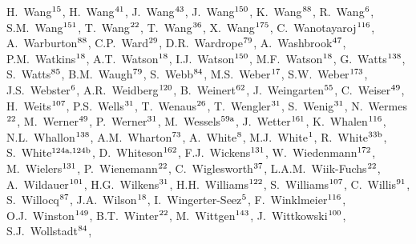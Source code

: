 \begin{flushleft}
H.~Wang$^\textrm{\scriptsize 15}$,
H.~Wang$^\textrm{\scriptsize 41}$,
J.~Wang$^\textrm{\scriptsize 43}$,
J.~Wang$^\textrm{\scriptsize 150}$,
K.~Wang$^\textrm{\scriptsize 88}$,
R.~Wang$^\textrm{\scriptsize 6}$,
S.M.~Wang$^\textrm{\scriptsize 151}$,
T.~Wang$^\textrm{\scriptsize 22}$,
T.~Wang$^\textrm{\scriptsize 36}$,
X.~Wang$^\textrm{\scriptsize 175}$,
C.~Wanotayaroj$^\textrm{\scriptsize 116}$,
A.~Warburton$^\textrm{\scriptsize 88}$,
C.P.~Ward$^\textrm{\scriptsize 29}$,
D.R.~Wardrope$^\textrm{\scriptsize 79}$,
A.~Washbrook$^\textrm{\scriptsize 47}$,
P.M.~Watkins$^\textrm{\scriptsize 18}$,
A.T.~Watson$^\textrm{\scriptsize 18}$,
I.J.~Watson$^\textrm{\scriptsize 150}$,
M.F.~Watson$^\textrm{\scriptsize 18}$,
G.~Watts$^\textrm{\scriptsize 138}$,
S.~Watts$^\textrm{\scriptsize 85}$,
B.M.~Waugh$^\textrm{\scriptsize 79}$,
S.~Webb$^\textrm{\scriptsize 84}$,
M.S.~Weber$^\textrm{\scriptsize 17}$,
S.W.~Weber$^\textrm{\scriptsize 173}$,
J.S.~Webster$^\textrm{\scriptsize 6}$,
A.R.~Weidberg$^\textrm{\scriptsize 120}$,
B.~Weinert$^\textrm{\scriptsize 62}$,
J.~Weingarten$^\textrm{\scriptsize 55}$,
C.~Weiser$^\textrm{\scriptsize 49}$,
H.~Weits$^\textrm{\scriptsize 107}$,
P.S.~Wells$^\textrm{\scriptsize 31}$,
T.~Wenaus$^\textrm{\scriptsize 26}$,
T.~Wengler$^\textrm{\scriptsize 31}$,
S.~Wenig$^\textrm{\scriptsize 31}$,
N.~Wermes$^\textrm{\scriptsize 22}$,
M.~Werner$^\textrm{\scriptsize 49}$,
P.~Werner$^\textrm{\scriptsize 31}$,
M.~Wessels$^\textrm{\scriptsize 59a}$,
J.~Wetter$^\textrm{\scriptsize 161}$,
K.~Whalen$^\textrm{\scriptsize 116}$,
N.L.~Whallon$^\textrm{\scriptsize 138}$,
A.M.~Wharton$^\textrm{\scriptsize 73}$,
A.~White$^\textrm{\scriptsize 8}$,
M.J.~White$^\textrm{\scriptsize 1}$,
R.~White$^\textrm{\scriptsize 33b}$,
S.~White$^\textrm{\scriptsize 124a,124b}$,
D.~Whiteson$^\textrm{\scriptsize 162}$,
F.J.~Wickens$^\textrm{\scriptsize 131}$,
W.~Wiedenmann$^\textrm{\scriptsize 172}$,
M.~Wielers$^\textrm{\scriptsize 131}$,
P.~Wienemann$^\textrm{\scriptsize 22}$,
C.~Wiglesworth$^\textrm{\scriptsize 37}$,
L.A.M.~Wiik-Fuchs$^\textrm{\scriptsize 22}$,
A.~Wildauer$^\textrm{\scriptsize 101}$,
H.G.~Wilkens$^\textrm{\scriptsize 31}$,
H.H.~Williams$^\textrm{\scriptsize 122}$,
S.~Williams$^\textrm{\scriptsize 107}$,
C.~Willis$^\textrm{\scriptsize 91}$,
S.~Willocq$^\textrm{\scriptsize 87}$,
J.A.~Wilson$^\textrm{\scriptsize 18}$,
I.~Wingerter-Seez$^\textrm{\scriptsize 5}$,
F.~Winklmeier$^\textrm{\scriptsize 116}$,
O.J.~Winston$^\textrm{\scriptsize 149}$,
B.T.~Winter$^\textrm{\scriptsize 22}$,
M.~Wittgen$^\textrm{\scriptsize 143}$,
J.~Wittkowski$^\textrm{\scriptsize 100}$,
S.J.~Wollstadt$^\textrm{\scriptsize 84}$,

\end{flushleft}
